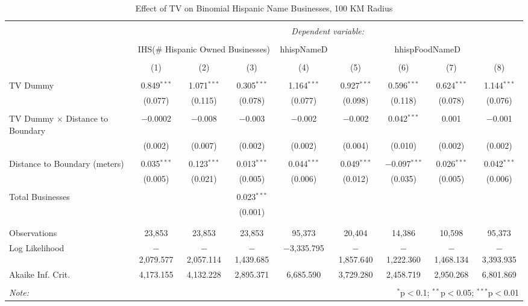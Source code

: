 
\begin{table}[!htbp] \centering 
  \caption{Effect of TV on Binomial Hispanic Name Businesses, 100 KM Radius} 
  \label{} 
\begin{tabular}{@{\extracolsep{-5pt}}lcccccccc} 
\\[-1.8ex]\hline 
\hline \\[-1.8ex] 
 & \multicolumn{8}{c}{\textit{Dependent variable:}} \\ 
\cline{2-9} 
\\[-1.8ex] & \multicolumn{3}{c}{IHS(\# Hispanic Owned Businesses)} & hhispNameD & \multicolumn{4}{c}{hhispFoodNameD} \\ 
\\[-1.8ex] & (1) & (2) & (3) & (4) & (5) & (6) & (7) & (8)\\ 
\hline \\[-1.8ex] 
 TV Dummy & 0.849$^{***}$ & 1.071$^{***}$ & 0.305$^{***}$ & 1.164$^{***}$ & 0.927$^{***}$ & 0.596$^{***}$ & 0.624$^{***}$ & 1.144$^{***}$ \\ 
  & (0.077) & (0.115) & (0.078) & (0.077) & (0.098) & (0.118) & (0.078) & (0.076) \\ 
  & & & & & & & & \\ 
 TV Dummy $\times$ Distance to Boundary  & $-$0.0002 & $-$0.008 & $-$0.003 & $-$0.002 & $-$0.002 & 0.042$^{***}$ & 0.001 & $-$0.001 \\ 
  & (0.002) & (0.007) & (0.002) & (0.002) & (0.004) & (0.010) & (0.002) & (0.002) \\ 
  & & & & & & & & \\ 
 Distance to Boundary (meters) & 0.035$^{***}$ & 0.123$^{***}$ & 0.013$^{***}$ & 0.044$^{***}$ & 0.049$^{***}$ & $-$0.097$^{***}$ & 0.026$^{***}$ & 0.042$^{***}$ \\ 
  & (0.005) & (0.021) & (0.005) & (0.006) & (0.012) & (0.035) & (0.005) & (0.006) \\ 
  & & & & & & & & \\ 
 Total Businesses &  &  & 0.023$^{***}$ &  &  &  &  &  \\ 
  &  &  & (0.001) &  &  &  &  &  \\ 
  & & & & & & & & \\ 
\hline \\[-1.8ex] 
Observations & 23,853 & 23,853 & 23,853 & 95,373 & 20,404 & 14,386 & 10,598 & 95,373 \\ 
Log Likelihood & $-$2,079.577 & $-$2,057.114 & $-$1,439.685 & $-$3,335.795 & $-$1,857.640 & $-$1,222.360 & $-$1,468.134 & $-$3,393.935 \\ 
Akaike Inf. Crit. & 4,173.155 & 4,132.228 & 2,895.371 & 6,685.590 & 3,729.280 & 2,458.719 & 2,950.268 & 6,801.869 \\ 
\hline 
\hline \\[-1.8ex] 
\textit{Note:}  & \multicolumn{8}{r}{$^{*}$p$<$0.1; $^{**}$p$<$0.05; $^{***}$p$<$0.01} \\ 
\end{tabular} 
\end{table} 
